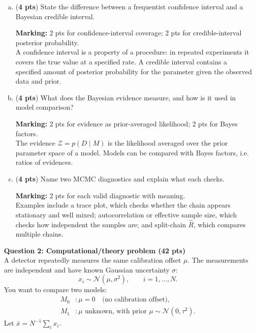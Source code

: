 \documentclass{article}
\newcommand{\givesolutions}{true}
\newcommand{\answer}[2]{%
\ifthenelse{\equal{#2}{true}}%
{{\color{blue}#1}}%
{}%
}
\newenvironment{ansbox}[1]{%
  \begin{lrbox}{\mybox}\begin{minipage}[t][#1]{\linewidth}%
}{%
  \vfill\hfill\end{minipage}\end{lrbox}\fbox{\usebox{\mybox}}%
}
\begin{document}
\begin{enumerate}[(a)]
    \item ({\bf 4 pts}) State the difference between a frequentist confidence interval and a Bayesian credible interval. \\
    \begin{ansbox}{1.2in}
    \answer{\textbf{Marking:} 2 pts for confidence-interval coverage; 2 pts for credible-interval posterior probability.\\A confidence interval is a property of a procedure: in repeated experiments it covers the true value at a specified rate. A credible interval contains a specified amount of posterior probability for the parameter given the observed data and prior.}{\givesolutions}
    \end{ansbox}

    \item ({\bf 4 pts}) What does the Bayesian evidence measure, and how is it used in model comparison? \\
    \begin{ansbox}{1.2in}
    \answer{\textbf{Marking:} 2 pts for evidence as prior-averaged likelihood; 2 pts for Bayes factors.\\The evidence $\mathcal Z=p(D\mid M)$ is the likelihood averaged over the prior parameter space of a model. Models can be compared with Bayes factors, i.e. ratios of evidences.}{\givesolutions}
    \end{ansbox}

    \item ({\bf 4 pts}) Name two MCMC diagnostics and explain what each checks. \\
    \begin{ansbox}{1.2in}
    \answer{\textbf{Marking:} 2 pts for each valid diagnostic with meaning.\\Examples include a trace plot, which checks whether the chain appears stationary and well mixed; autocorrelation or effective sample size, which checks how independent the samples are; and split-chain $\hat R$, which compares multiple chains.}{\givesolutions}
    \end{ansbox}
\end{enumerate}

\newpage

\noindent\large{{\bf{Question 2: Computational/theory problem (42 pts)}}}\\

A detector repeatedly measures the same calibration offset $\mu$. The measurements are independent and have known Gaussian uncertainty $\sigma$:
\[
x_i\sim \mathcal N(\mu,\sigma^2), \qquad i=1,\dots,N.
\]
You want to compare two models:
\begin{align*}
M_0 &: \mu=0 \quad \text{(no calibration offset)},\\
M_1 &: \mu \text{ unknown, with prior } \mu\sim\mathcal N(0,\tau^2).
\end{align*}
Let $\bar x=N^{-1}\sum_i x_i$.
\end{document}
